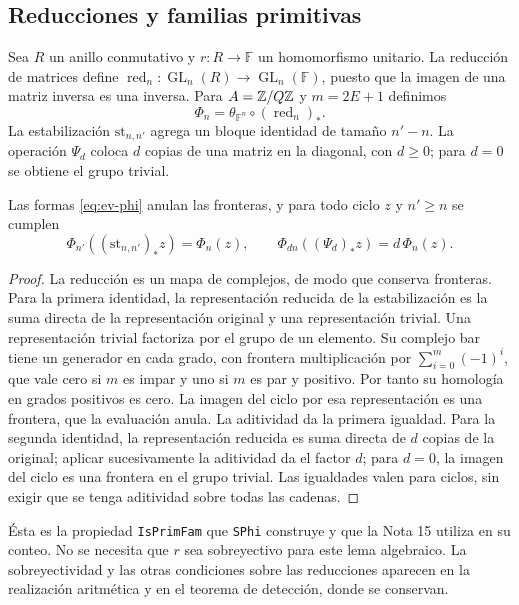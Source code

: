 \subsection{Reducciones y familias primitivas}

Sea $R$ un anillo conmutativo y $r:R\to\mathbb F$ un homomorfismo unitario. La reducción de matrices define $\operatorname{red}_n:\operatorname{GL}_n(R)\to\operatorname{GL}_n(\mathbb F)$, puesto que la imagen de una matriz inversa es una inversa. Para $A=\mathbb{Z}/Q\mathbb{Z}$ y $m=2E+1$ definimos
\begin{equation}
 \Phi_n=\theta_{\mathbb F^n}\circ(\operatorname{red}_n)_*.
 \label{eq:ev-phi}
\end{equation}
La estabilización $\mathrm{st}_{n,n'}$ agrega un bloque identidad de tamaño $n'-n$. La operación $\Psi_d$ coloca $d$ copias de una matriz en la diagonal, con $d\ge0$; para $d=0$ se obtiene el grupo trivial.

\begin{teorema}
\label{thm:ev-primitividad}
Las formas \eqref{eq:ev-phi} anulan las fronteras, y para todo ciclo $z$ y $n'\ge n$ se cumplen
\begin{equation}
 \Phi_{n'}((\mathrm{st}_{n,n'})_*z)=\Phi_n(z),\qquad
 \Phi_{dn}((\Psi_d)_*z)=d\,\Phi_n(z).
 \label{eq:ev-phi-identidades}
\end{equation}
\end{teorema}
\begin{proof}
La reducción es un mapa de complejos, de modo que conserva fronteras. Para la primera identidad, la representación reducida de la estabilización es la suma directa de la representación original y una representación trivial. Una representación trivial factoriza por el grupo de un elemento. Su complejo bar tiene un generador en cada grado, con frontera multiplicación por $\sum_{i=0}^m(-1)^i$, que vale cero si $m$ es impar y uno si $m$ es par y positivo. Por tanto su homología en grados positivos es cero. La imagen del ciclo por esa representación es una frontera, que la evaluación anula. La aditividad da la primera igualdad. Para la segunda identidad, la representación reducida es suma directa de $d$ copias de la original; aplicar sucesivamente la aditividad da el factor $d$; para $d=0$, la imagen del ciclo es una frontera en el grupo trivial. Las igualdades valen para ciclos, sin exigir que se tenga aditividad sobre todas las cadenas.
\end{proof}

Ésta es la propiedad \texttt{IsPrimFam} que \texttt{SPhi} construye y que la Nota 15 utiliza en su conteo. No se necesita que $r$ sea sobreyectivo para este lema algebraico. La sobreyectividad y las otras condiciones sobre las reducciones aparecen en la realización aritmética y en el teorema de detección, donde se conservan.

